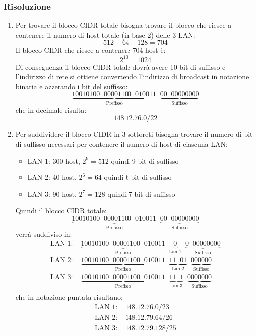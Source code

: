 \documentclass[a4paper]{article}
\begin{document}
\subsubsection{Risoluzione}
\begin{enumerate}
  \item 
    Per trovare il blocco CIDR totale bisogna trovare il blocco che riesce a contenere
    il numero di host totale (in base 2) delle 3 LAN:
    \[
      512 + 64 + 128 = 704
    \] 
    Il blocco CIDR che riesce a contenere 704 host è:
    \[
      2^{10} = 1024
    \] 
    Di conseguenza il blocco CIDR totale dovrà avere 10 bit di suffisso e l'indirizzo di
    rete si ottiene convertendo l'indirizzo di broadcast in notazione binaria e azzerando
    i bit del suffisso:
    \[
      \underbrace{1001 0100 \;\; 0000 1100 \;\; 0100 11}_{\text{Prefisso}}
      \;\; \underbrace{00 \;\; 00000000}_{\text{Suffisso}}
    \] 
    che in decimale risulta:
    \[
      148.12.76.0/22
    \] 

  \item 
    Per suddividere il blocco CIDR in 3 sottoreti bisogna trovare il numero di bit di
    suffisso necessari per contenere il numero di host di ciascuna LAN:
    \begin{itemize}
      \item LAN 1: 300 host, \( 2^9 = 512 \) quindi 9 bit di suffisso
      \item LAN 2: 40 host, \( 2^6 = 64 \) quindi 6 bit di suffisso
      \item LAN 3: 90 host, \( 2^7 = 128 \) quindi 7 bit di suffisso
    \end{itemize}
    Quindi il blocco CIDR totale:
    \[
      \underbrace{1001 0100 \;\; 0000 1100 \;\; 0100 11}_{\text{Prefisso}}
      \;\; \underbrace{00 \;\; 00000000}_{\text{Suffisso}}
    \] 
    verrà suddiviso in:
    \[
      \begin{aligned}
        \text{LAN 1: } &
        \underbrace{1001 0100 \;\; 0000 1100 \;\; 0100 11}_{\text{Prefisso}}
        \;\; \underbrace{0}_{\text{Lan 1}}
        \;\; \underbrace{0\;\;00000000}_{\text{Suffisso}}\\
        \text{LAN 2: } &
        \underbrace{1001 0100 \;\; 0000 1100 \;\; 0100 11}_{\text{Prefisso}}
        \;\; \underbrace{11\;\;01}_{\text{Lan 2}}
        \;\; \underbrace{000000}_{\text{Suffisso}}\\
        \text{LAN 3: } &
        \underbrace{1001 0100 \;\; 0000 1100 \;\; 0100 11}_{\text{Prefisso}}
        \;\; \underbrace{11\;\;1}_{\text{Lan 3}}
        \;\; \underbrace{0000000}_{\text{Suffisso}}\\
      \end{aligned}
    \]
    che in notazione puntata risultano:
    \[
    \begin{aligned}
      \text{LAN 1: } & 148.12.76.0/23\\
      \text{LAN 2: } & 148.12.79.64/26\\
      \text{LAN 3: } & 148.12.79.128/25
    \end{aligned}
    \] 
\end{enumerate}
\end{document}
